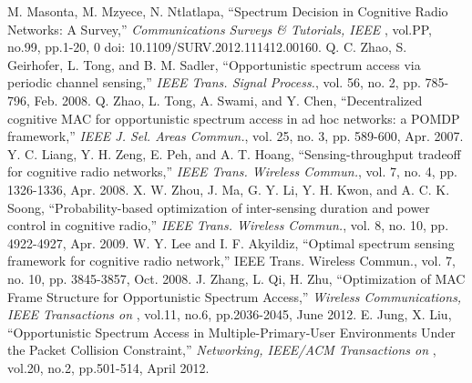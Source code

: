 \begin{thebibliography}{1}
 M. Masonta, M. Mzyece, N. Ntlatlapa, ``Spectrum Decision in Cognitive Radio Networks: A Survey,'' \emph{Communications Surveys \& Tutorials, IEEE }, vol.PP, no.99, pp.1-20, 0 doi: 10.1109/SURV.2012.111412.00160.
 Q. C. Zhao, S. Geirhofer, L. Tong, and B. M. Sadler, ``Opportunistic spectrum access via periodic channel sensing,'' \emph{IEEE Trans. Signal Process.}, vol. 56, no. 2, pp. 785-796, Feb. 2008.
 Q. Zhao, L. Tong, A. Swami, and Y. Chen, ``Decentralized cognitive MAC for opportunistic spectrum access in ad hoc networks: a POMDP framework,'' \emph{IEEE J. Sel. Areas Commun.}, vol. 25, no. 3, pp. 589-600, Apr. 2007.
 Y. C. Liang, Y. H. Zeng, E. Peh, and A. T. Hoang, ``Sensing-throughput tradeoff for cognitive radio networks,'' \emph{IEEE Trans. Wireless Commun.}, vol. 7, no. 4, pp. 1326-1336, Apr. 2008.
 X. W. Zhou, J. Ma, G. Y. Li, Y. H. Kwon, and A. C. K. Soong, ``Probability-based optimization of inter-sensing duration and power control in cognitive radio,'' \emph{IEEE Trans. Wireless Commun.}, vol. 8, no.
10, pp. 4922-4927, Apr. 2009.
 W. Y. Lee and I. F. Akyildiz, ``Optimal spectrum sensing framework for cognitive radio network,'' IEEE Trans. Wireless Commun., vol. 7, no. 10, pp. 3845-3857, Oct. 2008.
 J. Zhang, L. Qi, H. Zhu, ``Optimization of MAC Frame Structure for Opportunistic Spectrum Access,'' \emph{Wireless Communications, IEEE Transactions on }, vol.11, no.6, pp.2036-2045, June 2012.
 E. Jung, X. Liu, ``Opportunistic Spectrum Access in Multiple-Primary-User Environments Under the Packet Collision Constraint,'' \emph{Networking, IEEE/ACM Transactions on }, vol.20, no.2, pp.501-514, April 2012.


\end{thebibliography}
